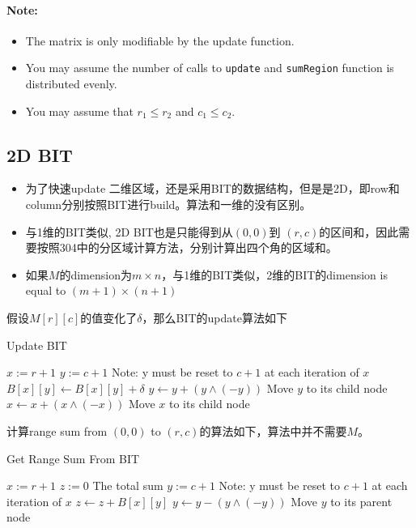\paragraph{Note:}
\begin{itemize}
\item The matrix is only modifiable by the update function.
\item You may assume the number of calls to \texttt{update} and \texttt{sumRegion} function is distributed evenly.
 \item You may assume that $r_1 \leq r_2$ and $c_1 \leq c_2$.
\end{itemize}
\subsection{2D BIT}
\begin{itemize}
\item 为了快速update 二维区域，还是采用BIT的数据结构，但是是2D，即row和column分别按照BIT进行build。算法和一维的没有区别。
\item 与1维的BIT类似, 2D BIT也是只能得到从$ (0,0) $到 $ (r,c) $的区间和，因此需要按照304中的分区域计算方法，分别计算出四个角的区域和。
\item 如果$M$的dimension为$m\times n$，与1维的BIT类似，2维的BIT的dimension is equal to $ (m+1)\times (n+1) $
\end{itemize}
假设$M[r][c]$的值变化了$\delta$，那么BIT的update算法如下
\setcounter{algorithm}{0}
\begin{algorithm}[H]
\caption{Update BIT}
\begin{algorithmic}[1]
\State $x:=r+1$
\State $y:=c+1$ \Comment Note: y must be reset to $ c+1 $ at each iteration of $ x $
\State $ B[x][y]\gets B[x][y] + \delta $
\State $y\gets y + (y\land (-y))$ \Comment Move $y$ to its child node
\EndWhile
\State $x\gets x + (x\land (-x))$ \Comment Move $x$ to its child node
\EndWhile
\EndProcedure
\end{algorithmic}
\end{algorithm}
计算range sum from $ (0,0) $ to $ (r,c) $的算法如下，算法中并不需要$M$。
\begin{algorithm}[H]
\caption{Get Range Sum From BIT}
\begin{algorithmic}[1]
\State $x:=r+1$
\State $z:=0$ \Comment The total sum
\State $y:=c+1$ \Comment Note: y must be reset to $ c+1 $ at each iteration of $ x $
\State $z\gets z+B[x][y]$
\State $y\gets y - (y\land (-y))$ \Comment Move $y$ to its parent node
\end{algorithmic}
\end{algorithm}
